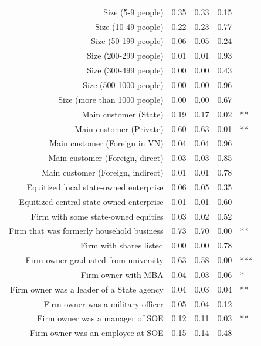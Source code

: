 \documentclass{beamer}
\begin{document}
\begin{frame}
{\begin{tabular}{rrrrl}
  Size (5-9 people) & 0.35 & 0.33 & 0.15 &  \\ 
  Size (10-49 people) & 0.22 & 0.23 & 0.77 &  \\ 
  Size (50-199 people) & 0.06 & 0.05 & 0.24 &  \\ 
  Size (200-299 people) & 0.01 & 0.01 & 0.93 &  \\ 
  Size (300-499 people) & 0.00 & 0.00 & 0.43 &  \\ 
  Size (500-1000 people) & 0.00 & 0.00 & 0.96 &  \\ 
  Size (more than 1000 people) & 0.00 & 0.00 & 0.67 &  \\ 
  Main customer (State) & 0.19 & 0.17 & 0.02 & ** \\ 
  Main customer (Private) & 0.60 & 0.63 & 0.01 & ** \\ 
  Main customer (Foreign in VN) & 0.04 & 0.04 & 0.96 &  \\ 
  Main customer (Foreign, direct) & 0.03 & 0.03 & 0.85 &  \\ 
  Main customer (Foreign, indirect) & 0.01 & 0.01 & 0.78 &  \\ 
  Equitized local state-owned enterprise & 0.06 & 0.05 & 0.35 &  \\ 
  Equitized central state-owned enterprise & 0.01 & 0.01 & 0.60 &  \\ 
  Firm with some state-owned equities & 0.03 & 0.02 & 0.52 &  \\ 
  Firm that was formerly household business & 0.73 & 0.70 & 0.00 & ** \\ 
  Firm with shares listed & 0.00 & 0.00 & 0.78 &  \\ 
  Firm owner graduated from university & 0.63 & 0.58 & 0.00 & *** \\ 
  Firm owner with MBA & 0.04 & 0.03 & 0.06 & * \\ 
  Firm owner was a leader of a State agency & 0.04 & 0.03 & 0.04 & ** \\ 
  Firm owner was a military officer & 0.05 & 0.04 & 0.12 &  \\ 
  Firm owner was a manager of SOE & 0.12 & 0.11 & 0.03 & ** \\ 
  Firm owner was an employee at SOE & 0.15 & 0.14 & 0.48 &  \\ 
   \hline
\end{tabular}          
}
\end{frame}
\end{document}
